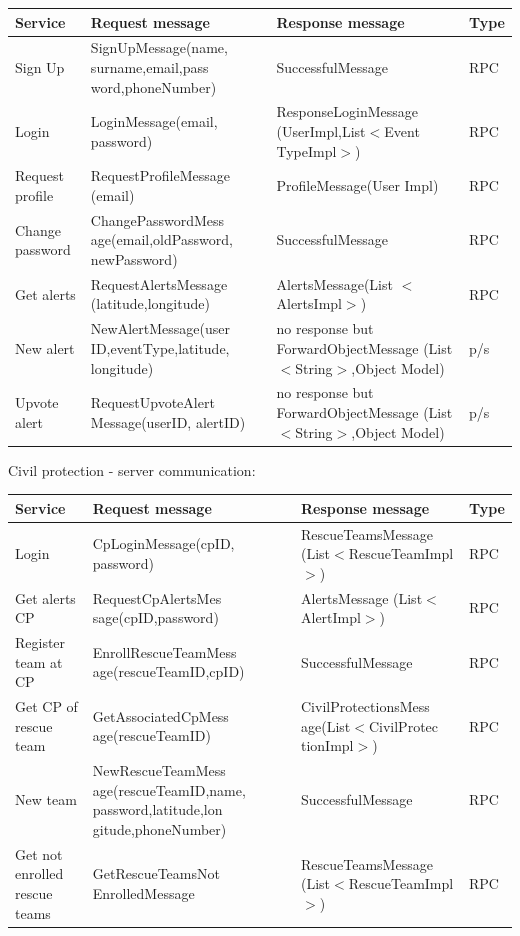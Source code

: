 \documentclass[a4paper,12pt]{report}
\begin{document}
\begin{center}
\begin{tabular}{ |p{4cm}|p{4cm}|p{4cm}|p{2cm}| } 
\hline
Service 			& Request message 	& Response message		& Type 	\\
\hline
Sign Up  			& SignUpMessage(name, surname,email,pass word,phoneNumber)		& SuccessfulMessage 	& RPC	\\ 
Login 				& LoginMessage(email, password) 	& ResponseLoginMessage (UserImpl,List$<$Event TypeImpl$>$)	& RPC	\\ 
Request profile 	& RequestProfileMessage (email)		& ProfileMessage(User Impl)	& RPC	\\ 
Change password		& ChangePasswordMess age(email,oldPassword, newPassword)	& SuccessfulMessage	& RPC	\\
Get alerts		& RequestAlertsMessage (latitude,longitude)	& AlertsMessage(List $<$AlertsImpl$>$)	& RPC	\\
New alert		& NewAlertMessage(user ID,eventType,latitude, longitude)	& no response but ForwardObjectMessage (List$<$String$>$,Object Model)	& p/s	\\
Upvote alert		& RequestUpvoteAlert Message(userID, alertID)	& no response but ForwardObjectMessage (List$<$String$>$,Object Model)	& p/s	\\
\hline
\end{tabular}
\end{center}

Civil protection - server communication:

\begin{center}
\begin{tabular}{ |p{4cm}|p{4cm}|p{4cm}|p{2cm}| } 
\hline
Service 			& Request message 	& Response message		& Type 	\\
\hline
Login	& CpLoginMessage(cpID, password)	& RescueTeamsMessage (List$<$RescueTeamImpl$>$) 	& RPC	\\ 
Get alerts CP	& RequestCpAlertsMes sage(cpID,password)	& AlertsMessage (List$<$AlertImpl$>$) 	& RPC	\\ 
Register team at CP		& EnrollRescueTeamMess age(rescueTeamID,cpID)	& SuccessfulMessage & RPC	\\ 
Get CP of rescue team 	& GetAssociatedCpMess age(rescueTeamID)		& CivilProtectionsMess age(List$<$CivilProtec tionImpl$>$)	& RPC	\\ 
New team	& NewRescueTeamMess age(rescueTeamID,name, password,latitude,lon gitude,phoneNumber)	& SuccessfulMessage	& RPC	\\
Get not enrolled rescue teams & GetRescueTeamsNot EnrolledMessage	& RescueTeamsMessage (List$<$RescueTeamImpl$>$)	& RPC	\\
\hline
\end{tabular}
\end{center}
\end{document}

